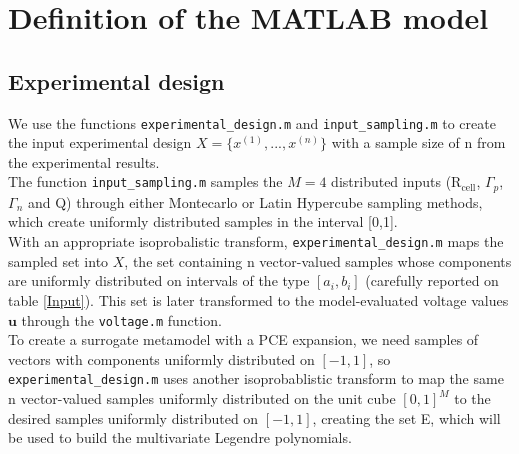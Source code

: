 \documentclass[a4paper,12pt]{article} %
\begin{document}
\clearpage

\section{Definition of the MATLAB model}

\subsection{Experimental design}
We use the functions \texttt{experimental\_design.m} and \texttt{input\_sampling.m} to create the input experimental design $X = \{x^{(1)}, ..., x^{(n)}\}$ with a sample size of n from the experimental results. \\
The function \texttt{input\_sampling.m} samples the $M=4$ distributed inputs (R$_{\text{cell}}$, $\Gamma_{p}$, $\Gamma_{n}$ and Q) through either Montecarlo or Latin Hypercube sampling methods, which create uniformly distributed samples in the interval [0,1].\\
With an appropriate isoprobalistic transform, \texttt{experimental\_design.m} maps the sampled set into $X$, the set containing n vector-valued samples whose components are uniformly distributed on intervals of the type $[a_i,b_i]$ (carefully reported on table \ref{Input}). This set is later transformed to the model-evaluated voltage values $\mathbf{u}$ through the \texttt{voltage.m} function.\\
To create a surrogate metamodel with a PCE expansion, we need samples of vectors with components uniformly distributed on $[-1,1]$, so \texttt{experimental\_design.m} uses another isoprobablistic transform to map the same n vector-valued samples uniformly distributed on the unit cube $[0,1]^{M}$ to the desired samples uniformly distributed on $[-1,1]$, creating the set E, which will be used to build the multivariate Legendre polynomials.


\end{document}
